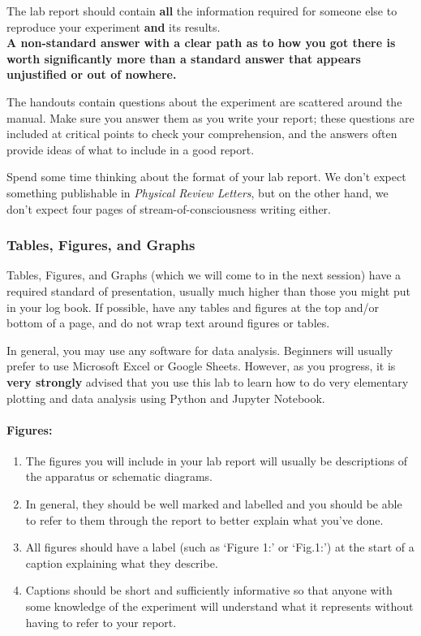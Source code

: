 \begin{imp}
The lab report should contain \textbf{all} the information required for someone else to reproduce your experiment \textbf{and} its results.~\\

\textbf{A non-standard answer with a clear path as to how you got there is worth significantly more than a standard answer that appears unjustified or out of nowhere. }
\end{imp}

The handouts contain questions about the experiment are scattered around the manual. Make sure you answer them as you write your report; these questions are included at critical points to check your comprehension, and the answers often provide ideas of what to include in a good report. 

\begin{imp}
Spend some time thinking about the format of your lab report. We don't expect something publishable in \textit{Physical Review Letters}, but on the other hand, we don't expect four pages of stream-of-consciousness writing either.
\end{imp}

\subsubsection{Tables, Figures, and Graphs}

Tables, Figures, and Graphs (which we will come to in the next session) have a required standard of presentation, usually much higher than those you might put in your log book. If possible, have any tables and figures at the top and/or bottom of a page, and do not wrap text around figures or tables.

\begin{imp}
In general, you may use any software for data analysis. Beginners will usually prefer to use Microsoft Excel or Google Sheets. However, as you progress, it is \textbf{very strongly} advised that you use this lab to learn how to do very elementary plotting and data analysis using Python and Jupyter Notebook.
\end{imp}

\paragraph{Figures:} 
\begin{enumerate}
    \item The figures you will include in your lab report will usually be descriptions of the apparatus or schematic diagrams. 
    \item In general, they should be well marked and labelled and you should be able to refer to them through the report to better explain what you've done. 
    \item All figures should have a label (such as `Figure 1:' or `Fig.1:') at the start of a caption explaining what they describe. 
    \item Captions should be short and sufficiently informative so that anyone with some knowledge of the experiment will understand what it represents without having to refer to your report.
\end{enumerate}

